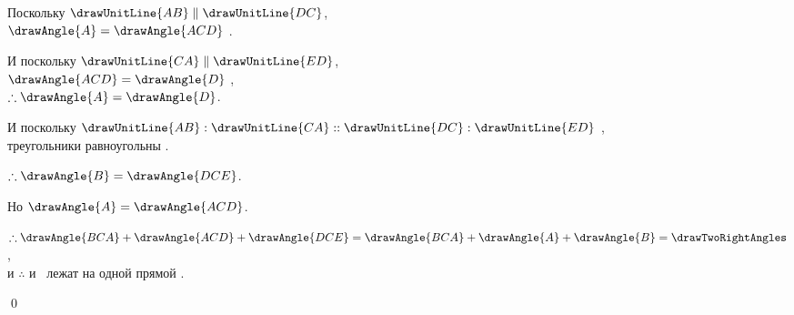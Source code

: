 \documentclass[letters,booklanguage=russian]{byrnebook}
\begin{document}
\begin{center}
Поскольку $\drawUnitLine{AB} \parallel \drawUnitLine{DC}$,\\
$\drawAngle{A} = \drawAngle{ACD}$ .

И поскольку $\drawUnitLine{CA} \parallel \drawUnitLine{ED}$,\\
$\drawAngle{ACD} = \drawAngle{D}$ ,\\
$\therefore \drawAngle{A} = \drawAngle{D}$.

И поскольку $\drawUnitLine{AB} : \drawUnitLine{CA} :: \drawUnitLine{DC} : \drawUnitLine{ED}$ \byref{\hypref},\\
треугольники равноугольны .

$\therefore \drawAngle{B} = \drawAngle{DCE}$.

Но $\drawAngle{A} = \drawAngle{ACD}$.

$\therefore \drawAngle{BCA} + \drawAngle{ACD} + \drawAngle{DCE} = \drawAngle{BCA} + \drawAngle{A} + \drawAngle{B} = \drawTwoRightAngles$ ,\\
и $\therefore$  и~ лежат на одной прямой .
\end{center}

\qed
\end{document}
